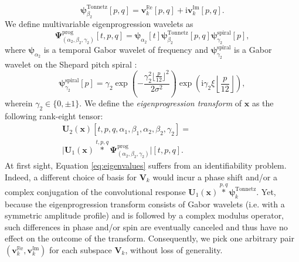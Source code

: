 \documentclass{article}
\makeatletter
\def\ie{i.e.\@\xspace}
\makeatother
\begin{document}
\begin{equation}
\boldsymbol{\psi}^{\mathrm{Tonnetz}}_{\beta_2}[p,q] =
\mathbf{v}_k^{\mathbb{R}\mathrm{e}}[p,q] + \mathrm{i} \mathbf{v}_k^{\mathbb{I}\mathrm{m}}[p,q].
\end{equation}
We define multivariable eigenprogression wavelets as
\begin{equation}
\boldsymbol{\Psi}_{(\alpha_2,\beta_2,\gamma_2)}^{\mathrm{prog}}[t,p,q] = \boldsymbol{\psi}_{\alpha_2}[t] \boldsymbol{\psi}_{\beta_2}^{\mathrm{Tonnetz}}[p,q] \boldsymbol{\psi}_{\gamma_2}^{\mathrm{spiral}}\left[ p \right],
\end{equation}
where $\boldsymbol{\psi}_{\alpha_2}$ is a temporal Gabor wavelet of frequency and $\boldsymbol{\psi}_{\gamma_2}^{\mathrm{spiral}}$ is a Gabor wavelet on the Shepard pitch spiral \cite{lostanlen2015dafx}:
\begin{equation}
\boldsymbol{\psi}_{\gamma_2}^{\mathrm{spiral}}[p] = 
\gamma_2 \exp\left(-\dfrac{\gamma_2^2 \lfloor \frac{p}{12} \rfloor^2}{2\sigma^2}\right) \exp\left(\mathrm{i}\gamma_2\xi \left\lfloor \frac{p}{12} \right\rfloor\right),
\end{equation}
wherein $\gamma_2 \in \{0, \pm1\}$.
We define the \emph{eigenprogression transform} of $\boldsymbol{x}$ as the following rank-eight tensor:
\begin{eqnarray}
\mathbf{U}_2(\boldsymbol{x})[t,p,q,\alpha_1,\beta_1,\alpha_2,\beta_2,\gamma_2]
= \qquad  \qquad \qquad \; \nonumber \\
\Big\vert \mathbf{U}_1(\boldsymbol{x})\overset{t,p,q}{\ast} \mathbf{\Psi}^\mathrm{prog}_{(\alpha_2,\beta_2,\gamma_2)} \Big\vert[t,p,q].
\end{eqnarray}
At first sight, Equation \ref{eq:eigenvalues} suffers from an identifiability problem.
Indeed, a different choice of basis for $\mathbf{V}_k$ would incur a phase shift and/or a complex conjugation of the convolutional response $\mathbf{U}_1(\mathbf{x}) \overset{p,q}{\ast} \boldsymbol{\psi}^{\mathrm{Tonnetz}}_k$.
Yet, because the eigenprogression transform consists of Gabor wavelets (\ie{} with a symmetric amplitude profile) and is followed by a complex modulus operator, such differences in phase and/or spin are eventually canceled and thus have no effect on the outcome of the transform.
Consequently, we pick one arbitrary pair $(\mathbf{v}_k^{\mathbb{R}\mathrm{e}}, \mathbf{v}_k^{\mathbb{I}\mathrm{m}})$ for each subspace $\mathbf{V}_k$, without loss of generality.
\end{document}
